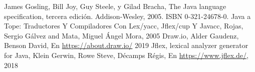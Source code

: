 \documentclass[12pt,a4paper]{article}
\begin{document}
%


\clearpage	
	\begin{thebibliography}{99}	
		 James Gosling, Bill Joy, Guy Steele, y Gilad Bracha, The Java language specification, tercera edición. Addison-Wesley, 2005. ISBN 0-321-24678-0.
		 Java a Tope: Traductores Y Compiladores Con Lex/yacc, Jflex/cup Y Javacc, Rojas, Sergio G{\'a}lvez and Mata, Miguel {\'A}ngel Mora, 2005
		 Draw.io, Alder Gaudenz, Benson David, En \url{https://about.draw.io/} 2019
		 Jflex, lexical analyzer generator for Java, Klein Gerwin, Rowe Steve, Décamps Régis, En \url{https://www.jflex.de/}, 2018
			
		
		
	
	\end{thebibliography}	
	
\end{document}
